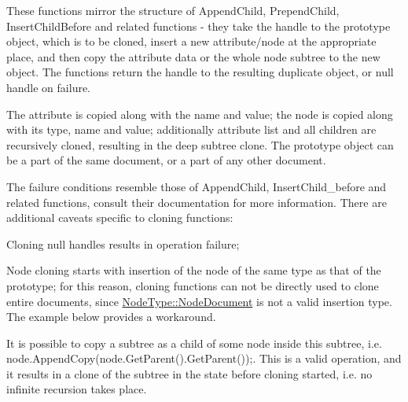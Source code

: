 These functions mirror the structure of AppendChild, PrependChild, InsertChildBefore and related functions -\/ they take the handle to the prototype object, which is to be cloned, insert a new attribute/node at the appropriate place, and then copy the attribute data or the whole node subtree to the new object. The functions return the handle to the resulting duplicate object, or null handle on failure. \par
 \par
 The attribute is copied along with the name and value; the node is copied along with its type, name and value; additionally attribute list and all children are recursively cloned, resulting in the deep subtree clone. The prototype object can be a part of the same document, or a part of any other document. \par
 \par
 The failure conditions resemble those of AppendChild, InsertChild\_\-before and related functions, consult their documentation for more information. There are additional caveats specific to cloning functions:
\begin{DoxyItemize}
\item Cloning null handles results in operation failure;
\item Node cloning starts with insertion of the node of the same type as that of the prototype; for this reason, cloning functions can not be directly used to clone entire documents, since \hyperlink{namespacephys_1_1xml_a668b0cc666a9d49f7c7222a7552115d3}{NodeType::NodeDocument} is not a valid insertion type. The example below provides a workaround.
\item It is possible to copy a subtree as a child of some node inside this subtree, i.e. node.AppendCopy(node.GetParent().GetParent());. This is a valid operation, and it results in a clone of the subtree in the state before cloning started, i.e. no infinite recursion takes place.
\end{DoxyItemize}

